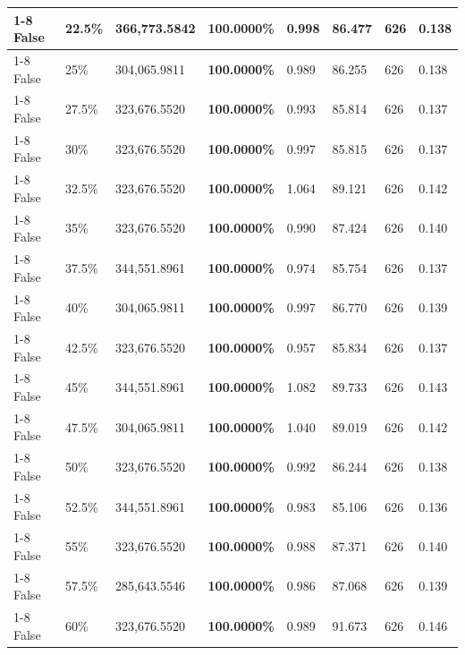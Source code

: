 \begin{table}[H]
\begin{tabular}{lllrllll}
\cline{1-8} \cline{2-8}
False & 22.5\% & 366,773.5842 & \bfseries \color{red} 100.0000\% & 0.998 & 86.477 & 626 & 0.138 \\
\cline{1-8} \cline{2-8}
False & 25\% & 304,065.9811 & \bfseries \color{red} 100.0000\% & 0.989 & 86.255 & 626 & 0.138 \\
\cline{1-8} \cline{2-8}
False & 27.5\% & 323,676.5520 & \bfseries \color{red} 100.0000\% & 0.993 & 85.814 & 626 & 0.137 \\
\cline{1-8} \cline{2-8}
False & 30\% & 323,676.5520 & \bfseries \color{red} 100.0000\% & 0.997 & 85.815 & 626 & 0.137 \\
\cline{1-8} \cline{2-8}
False & 32.5\% & 323,676.5520 & \bfseries \color{red} 100.0000\% & 1.064 & 89.121 & 626 & 0.142 \\
\cline{1-8} \cline{2-8}
False & 35\% & 323,676.5520 & \bfseries \color{red} 100.0000\% & 0.990 & 87.424 & 626 & 0.140 \\
\cline{1-8} \cline{2-8}
False & 37.5\% & 344,551.8961 & \bfseries \color{red} 100.0000\% & 0.974 & 85.754 & 626 & 0.137 \\
\cline{1-8} \cline{2-8}
False & 40\% & 304,065.9811 & \bfseries \color{red} 100.0000\% & 0.997 & 86.770 & 626 & 0.139 \\
\cline{1-8} \cline{2-8}
False & 42.5\% & 323,676.5520 & \bfseries \color{red} 100.0000\% & 0.957 & 85.834 & 626 & 0.137 \\
\cline{1-8} \cline{2-8}
False & 45\% & 344,551.8961 & \bfseries \color{red} 100.0000\% & 1.082 & 89.733 & 626 & 0.143 \\
\cline{1-8} \cline{2-8}
False & 47.5\% & 304,065.9811 & \bfseries \color{red} 100.0000\% & 1.040 & 89.019 & 626 & 0.142 \\
\cline{1-8} \cline{2-8}
False & 50\% & 323,676.5520 & \bfseries \color{red} 100.0000\% & 0.992 & 86.244 & 626 & 0.138 \\
\cline{1-8} \cline{2-8}
False & 52.5\% & 344,551.8961 & \bfseries \color{red} 100.0000\% & 0.983 & 85.106 & 626 & 0.136 \\
\cline{1-8} \cline{2-8}
False & 55\% & 323,676.5520 & \bfseries \color{red} 100.0000\% & 0.988 & 87.371 & 626 & 0.140 \\
\cline{1-8} \cline{2-8}
False & 57.5\% & \color{red} 285,643.5546 & \bfseries \color{red} 100.0000\% & 0.986 & 87.068 & 626 & 0.139 \\
\cline{1-8} \cline{2-8}
False & 60\% & 323,676.5520 & \bfseries \color{red} 100.0000\% & 0.989 & 91.673 & 626 & 0.146 \\

\end{tabular}
\end{table}
